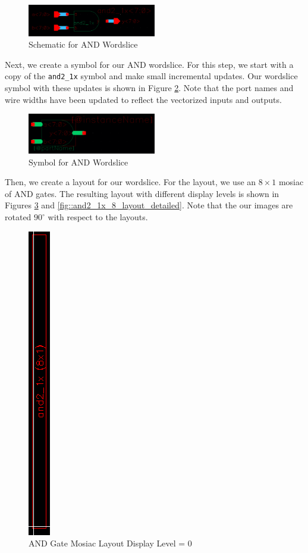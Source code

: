 \documentclass{article}
\begin{document}
	\begin{figure}[H]
		\centerline{\includegraphics[width=0.5\textwidth]{and2_1x_8_schematic.png}}
		\caption{Schematic for AND Wordslice}
		\label{fig::and2_1x_8_schematic}
	\end{figure}
	
	\noindent Next, we create a symbol for our AND wordslice. For this step, we start with a copy of the \texttt{and2\_1x} symbol and make small incremental updates. Our wordslice symbol with these updates is shown in Figure \ref{fig::and2_1x_8_symbol}. Note that the port names and wire widths have been updated to reflect the vectorized inputs and outputs.
	
	\begin{figure}[H]
		\centerline{\includegraphics[width=0.5\textwidth]{and2_1x_8_symbol.png}}
		\caption{Symbol for AND Wordslice}
		\label{fig::and2_1x_8_symbol}
	\end{figure}
	
	\noindent Then, we create a layout for our wordslice. For the layout, we use an $8 \times 1$ mosiac of AND gates. The resulting layout with different display levels is shown in Figures \ref{fig::and2_1x_8_layout_mosiac_overview} and \ref{fig::and2_1x_8_layout_detailed}. Note that the our images are rotated $90^{\circ}$ with respect to the layouts.  
	
	\begin{figure}[H]
		\centerline{\includegraphics[height=0.8\textwidth, angle=270]{and2_1x_8_layout_mosiac_overview.png}}
		\caption{AND Gate Mosiac Layout Display Level = 0}
		\label{fig::and2_1x_8_layout_mosiac_overview}
	\end{figure}
	
\end{document}
